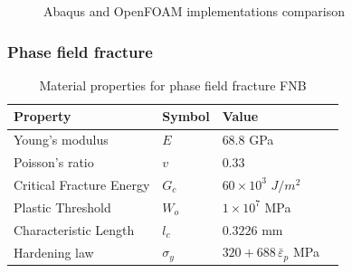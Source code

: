 \documentclass[sn-mathphys,Numbered,draft]{sn-jnl}%
\begin{document}
\begin{figure}[t!]
	\centering
	
		
		\caption{Abaqus and OpenFOAM implementations comparison}
	\label{label_for_entire_figure}
\end{figure}
\FloatBarrier

\subsubsection{Phase field fracture}

\begin{table}[htb]
	\centering
		\begin{tabular}{llll} \hline
			Property & Symbol & Value  \\ \hline 
			Young's modulus & $E$ & $68.8$ GPa \\
			Poisson's ratio & $v$ & $0.33$   \\
			Critical Fracture Energy & $G_c$ & $60\times10^3$ $J/m^2$ \\
			Plastic Threshold & $W_o$ & $1\times10^7$ MPa \\
			Characteristic Length & $l_c$ & $0.3226$ mm    \\
			Hardening law & $\sigma_y$ & $320+688\, {\bar{\varepsilon}}_p$ MPa  \\
			\hline
		\end{tabular}
	\caption{Material properties for phase field fracture FNB}
	\label{tab:material_properties}
\end{table}
\end{document}
